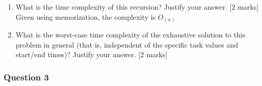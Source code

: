 \begin{enumerate}[label=(\alph*)]
\begin{enumerate}[label=(\roman*)]
{        }
        \item What is the time complexity of this recursion? Justify your answer. \hfill [2 marks] \\
        {\color{blue}
        Given using memorization, the complexity is $O_{(n)}$
        }
        \item What is the worst-case time complexity of the exhaustive solution to this problem in general (that is, independent of the specific task values and start/end times)? Justify your answer. \hfill [2 marks]
    \end{enumerate}
\end{enumerate}








\pagebreak
\subsubsection{Question 3}

